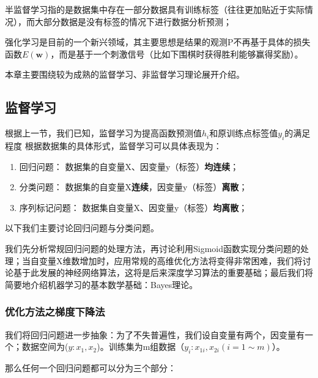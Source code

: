半监督学习指的是数据集中存在一部分数据具有训练标签（往往更加贴近于实际情况），而大部分数据是没有标签的情况下进行数据分析预测； 

强化学习是目前的一个新兴领域，其主要思想是结果的观测P不再基于具体的损失函数$E(\mathbf{w})$，而是基于一个刺激信号（比如下围棋时获得胜利能够赢得奖励）。

本章主要围绕较为成熟的监督学习、非监督学习理论展开介绍。

\subsection{监督学习}
根据上一节，我们已知，监督学习为提高函数预测值$h_i$和原训练点标签值$y_i$的满足程度
 根据数据集的具体形式，监督学习可以具体表现为：
\begin{enumerate}
\item 回归问题： 数据集的自变量X、因变量y（标签）\textbf{均连续}；
\item 分类问题： 数据集的自变量X\textbf{连续}，因变量y（标签）\textbf{离散}；
\item 序列标记问题： 数据集自变量X、因变量y（标签）\textbf{均离散}；
\end{enumerate}
以下我们主要讨论回归问题与分类问题。 

我们先分析常规回归问题的处理方法，再讨论利用Sigmoid函数实现分类问题的处理；当自变量X维数增加时，应用常规的高维优化方法将变得非常困难，我们将讨论基于此发展的神经网络算法，这将是后来深度学习算法的重要基础；最后我们将简要地介绍机器学习的基本数学基础：Bayes理论。

\subsubsection{优化方法之梯度下降法}
我们将回归问题进一步抽象：为了不失普遍性，我们设自变量有两个，因变量有一个；数据空间为($y: x_1, x_2$)。训练集为m组数据（$y_i: x_{1i}, x_{2i} (i=1\sim m)$）。 

那么任何一个回归问题都可以分为三个部分：

